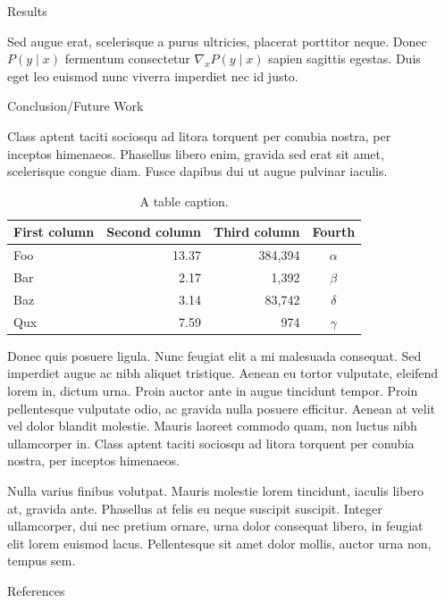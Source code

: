 \documentclass[final]{beamer}
\newlength{\sepwidth}
\newlength{\colwidth}
\newcommand{\separatorcolumn}{\begin{column}{\sepwidth}\end{column}}
\begin{document}
\begin{frame}[t]
\begin{columns}[t]
\begin{column}{\colwidth}
\begin{exampleblock}{Results}

    Sed augue erat, scelerisque a purus ultricies, placerat porttitor neque.
    Donec $P(y \mid x)$ fermentum consectetur $\nabla_x P(y \mid x)$ sapien
    sagittis egestas. Duis eget leo euismod nunc viverra imperdiet nec id
    justo.

  \end{exampleblock}

  \begin{block}{Conclusion/Future Work}

    Class aptent taciti sociosqu ad litora torquent per conubia nostra, per
    inceptos himenaeos. Phasellus libero enim, gravida sed erat sit amet,
    scelerisque congue diam. Fusce dapibus dui ut augue pulvinar iaculis.

    \begin{table}
      \centering
      \begin{tabular}{l r r c}
        \toprule
        \textbf{First column} & \textbf{Second column} & \textbf{Third column} & \textbf{Fourth} \\
        \midrule
        Foo & 13.37 & 384,394 & $\alpha$ \\
        Bar & 2.17 & 1,392 & $\beta$ \\
        Baz & 3.14 & 83,742 & $\delta$ \\
        Qux & 7.59 & 974 & $\gamma$ \\
        \bottomrule
      \end{tabular}
      \caption{A table caption.}
    \end{table}

    Donec quis posuere ligula. Nunc feugiat elit a mi malesuada consequat. Sed
    imperdiet augue ac nibh aliquet tristique. Aenean eu tortor vulputate,
    eleifend lorem in, dictum urna. Proin auctor ante in augue tincidunt
    tempor. Proin pellentesque vulputate odio, ac gravida nulla posuere
    efficitur. Aenean at velit vel dolor blandit molestie. Mauris laoreet
    commodo quam, non luctus nibh ullamcorper in. Class aptent taciti sociosqu
    ad litora torquent per conubia nostra, per inceptos himenaeos.

    Nulla varius finibus volutpat. Mauris molestie lorem tincidunt, iaculis
    libero at, gravida ante. Phasellus at felis eu neque suscipit suscipit.
    Integer ullamcorper, dui nec pretium ornare, urna dolor consequat libero,
    in feugiat elit lorem euismod lacus. Pellentesque sit amet dolor mollis,
    auctor urna non, tempus sem.

  \end{block}

  \begin{block}{References}

    \nocite{*}
    \footnotesize{}

  \end{block}

\end{column}

\separatorcolumn
\end{columns}
\end{frame}
\end{document}
